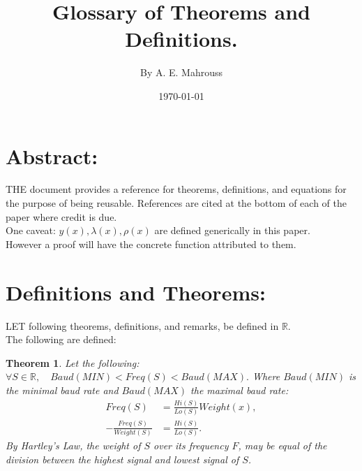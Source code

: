 \documentclass[10pt]{article}
\title{%
	\vspace{-1.5em}%
	\large\textbf{Glossary of Theorems and Definitions.}%
}
\author{By A. E. Mahrouss}
\date{\today}
\theoremstyle{plain}
\newtheorem{theorem}{Theorem}[section]
\theoremstyle{definition}
\theoremstyle{remark}
\begin{document}

\maketitle
\tableofcontents
\newpage

\section{Abstract:}

\lettrine[lines=2, lhang=0.1, loversize=0.2]{T}HE document provides a reference for theorems, definitions, and equations for the purpose of being reusable. References are cited at the bottom of each of the paper where credit is due.\\
One caveat: $y(x), \lambda(x), \rho(x)$ are defined generically in this paper.\\However a proof will have the concrete function attributed to them.

\section{Definitions and Theorems:}

\lettrine[lines=1, lhang=0.1, loversize=0.2]{L}ET following theorems, definitions, and remarks, be defined in $\mathbb{R}.$\\The following are defined:

\begin{theorem}
Let the following:
$\forall S \in \mathbb{R}, \quad Baud(MIN) < Freq(S) < Baud(MAX).$ Where $Baud(MIN)$ is the minimal baud rate and $Baud(MAX)$ the maximal baud rate:
\begin{align*}
	Freq(S) &= \frac{Hi(S)}{Lo(S)} Weight(x),\\
	-\frac{Freq(S)}{Weight(S)} &= \frac{Hi(S)}{Lo(S)}.
\end{align*}
By Hartley's Law, the weight of $S$ over its frequency $F$, may be equal of the division between the highest signal and lowest signal of $S$.
\end{theorem}
\end{document}

